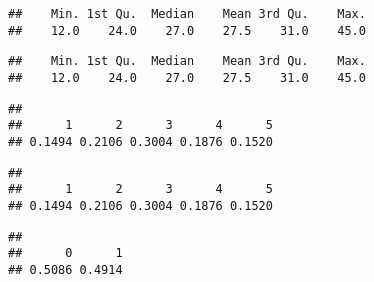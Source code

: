 \documentclass[
]{article}
\newenvironment{Shaded}{\begin{snugshade}}{\end{snugshade}}
\newcommand{\FunctionTok}[1]{\textcolor[rgb]{0.13,0.29,0.53}{\textbf{#1}}}
\newcommand{\NormalTok}[1]{#1}
\newcommand{\SpecialCharTok}[1]{\textcolor[rgb]{0.81,0.36,0.00}{\textbf{#1}}}
\begin{document}
\begin{verbatim}
##    Min. 1st Qu.  Median    Mean 3rd Qu.    Max. 
##    12.0    24.0    27.0    27.5    31.0    45.0
\end{verbatim}

\begin{Shaded}
\end{Shaded}

\begin{verbatim}
##    Min. 1st Qu.  Median    Mean 3rd Qu.    Max. 
##    12.0    24.0    27.0    27.5    31.0    45.0
\end{verbatim}

\begin{Shaded}
\end{Shaded}

\begin{verbatim}
## 
##      1      2      3      4      5 
## 0.1494 0.2106 0.3004 0.1876 0.1520
\end{verbatim}

\begin{Shaded}
\end{Shaded}

\begin{verbatim}
## 
##      1      2      3      4      5 
## 0.1494 0.2106 0.3004 0.1876 0.1520
\end{verbatim}

\begin{Shaded}
\end{Shaded}

\begin{verbatim}
## 
##      0      1 
## 0.5086 0.4914
\end{verbatim}
\end{document}
